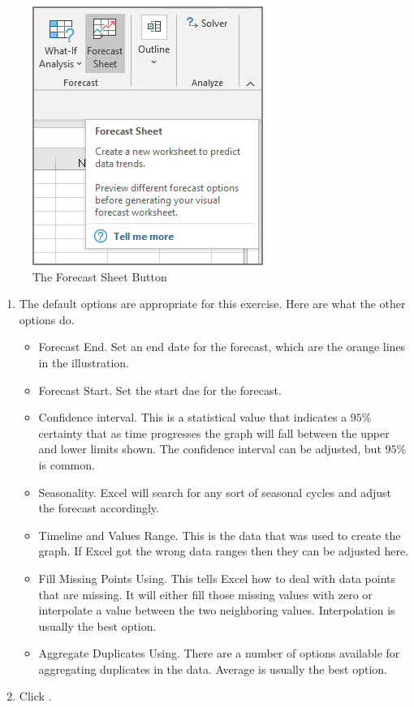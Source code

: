 \begin{figure}[H]
	\centering
	\includegraphics[width=\maxwidth{.95\linewidth}]{gfx/ch08_fig12}
	\caption{The Forecast Sheet Button}
	\label{08:fig12}
\end{figure}

\begin{enumerate}[resume]
	
	\item The default options are appropriate for this exercise. Here are what the other options do.
	
	\begin{itemize}
		\item Forecast End. Set an end date for the forecast, which are the orange lines in the illustration.
		\item Forecast Start. Set the start dae for the forecast.
		\item Confidence interval. This is a statistical value that indicates a $ 95 $\% certainty that as time progresses the graph will fall between the upper and lower limits shown. The confidence interval can be adjusted, but $ 95 $\% is common.
		\item Seasonality. Excel will search for any sort of seasonal cycles and adjust the forecast accordingly.
		\item Timeline and Values Range. This is the data that was used to create the graph. If Excel got the wrong data ranges then they can be adjusted here.
		\item Fill Missing Points Using. This tells Excel how to deal with data points that are missing. It will either fill those missing values with zero or interpolate a value between the two neighboring values. Interpolation is usually the best option.
		\item Aggregate Duplicates Using. There are a number of options available for aggregating duplicates in the data. Average is usually the best option.
	\end{itemize}	
	
	\item Click .

\end{enumerate}

